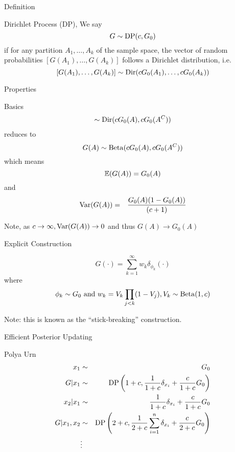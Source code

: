 \begin{frame}[t]{Definition}
\begin{block}{Dirichlet Process (DP), \citet{Ferguson1973}}
We say
 \[G \sim \DP(c,G_0)\]
 if for any partition $A_1, \ldots, A_k$ of the sample space, the vector of random probabilities
$[G(A_1), \ldots, G(A_k)]$ follows a Dirichlet distribution, i.e.
\[[G(A_1), \ldots, G(A_k)] \sim \Dir(cG_0(A_1), \ldots, cG_0(A_k))\]
\end{block}
\end{frame}	

\begin{frame}[t]{Properties}
\begin{block}{Basics}
\begin{eqnarray*} 
[G(A),G(A^C)] \sim \Dir(cG_0(A), cG_0(A^C)) 
\end{eqnarray*}
reduces to
\[G(A) \sim \Bet(cG_0(A), cG_0(A^C))\]
which means
\[ \Ave(G(A)) \comment{= \frac{cG_0(A)}{cG_0(A)+cG_0(A^C)}} = G_0(A)\] 
and
 \begin{eqnarray*} 
\Var(G(A)) &=& \comment{\frac{c^2G_0(A)G_0(A^C)}{(cG_0(A)+cG_0(A^C))^2(cG_0(A)+cG_0(A^C)+1)} \\
&=&} \frac{G_0(A)(1-G_0(A))}{(c+1)}
 \end{eqnarray*}
\end{block}
 Note, as $c\rightarrow\infty, \Var(G(A))\rightarrow0$ and thus $G(A) \rightarrow G_0(A)$
\end{frame}	

\begin{frame}[t]{Explicit Construction}
\begin{block}{\citet{Sethuraman1994a}}
\[G(\cdot) = \sum_{k=1}^\infty w_k \delta_{\phi_k}(\cdot)\]
where 
\[{\phi_k} \sim G_0 \mbox{ and } w_k = V_k\prod_{j<k}(1-V_j), V_k \sim \Bet(1,c)\]
\end{block}
Note: this is known as the ``stick-breaking'' construction.
\end{frame}	

\begin{frame}[t]{Efficient Posterior Updating}
\begin{block}{Polya Urn \citep{Blackwell1973}}
\begin{eqnarray*}
x_1 &\sim& G_0 \\
G | x_1 &\sim& \DP\left(1+c, \frac{1}{1+c}\delta_{x_i} + \frac{c}{1+c}G_0\right)\\
x_2 | x_1 &\sim& \frac{1}{1+c}\delta_{x_i} + \frac{c}{1+c}G_0 \\
G | x_1, x_2 &\sim& \DP\left(2+c, \frac{1}{2+c}\sum_{i=1}^n \delta_{x_i} + \frac{c}{2+c}G_0\right)\\
&\vdots&\\
\end{eqnarray*}
\end{block}
\end{frame}	


